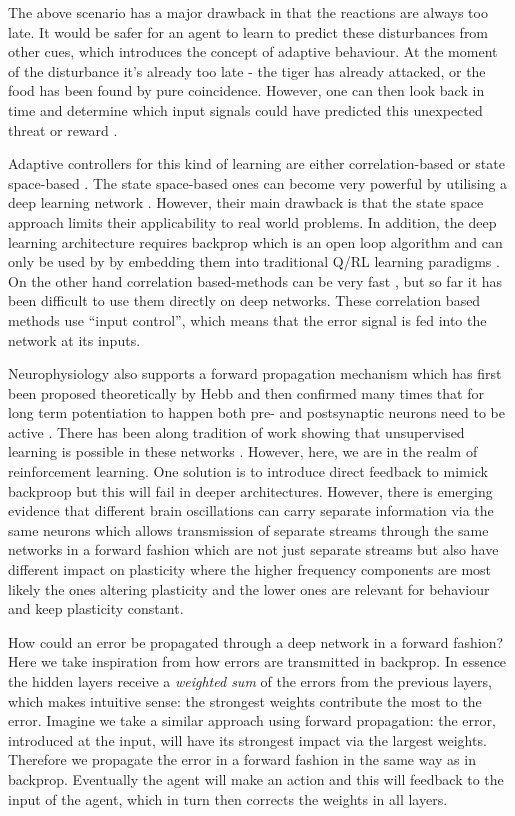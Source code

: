\documentclass{aamas2018}
\begin{document}
The above scenario has a major drawback in that the reactions are always
too late. It would be safer for an agent to learn to predict these
disturbances from other cues, which introduces the concept of adaptive behaviour.
At the moment of the disturbance it's already too late - the
tiger has already attacked, or the food has been found by pure
coincidence. However, one can then look back in time and determine
which input signals could have predicted this unexpected
threat or reward \cite{Sutton98,Woergoetter2005,PorrNecoInvco2003}.

Adaptive controllers for this kind of learning are either
correlation-based \cite{Klopf86,PorrNecoISO2003,Verschure91} or state
space-based \cite{Dayan1992,Sutton98}. The state space-based ones can
become very powerful by utilising a deep learning network
\cite{Guo2014}. However, their main drawback is that the state space
approach limits their applicability to real world problems. In
addition, the deep learning architecture requires backprop which
is an open loop algorithm and can only be used by
by embedding them into traditional Q/RL learning
paradigms \cite{Dayan1992,Guo2014}. On the other hand correlation
based-methods can be very fast \cite{Porr2006ICO}, but so far it has
been difficult to use them directly on deep networks. These
correlation based methods use ``input control'', which means that the
error signal is fed into the network at its inputs.

Neurophysiology also supports a forward propagation mechanism
which has first been proposed theoretically by Hebb \cite{Hebb49}
and then confirmed many times that for long term potentiation to happen
both pre- and postsynaptic neurons need to be active \cite{Luescher2012}.
There has been along tradition of work showing that unsupervised
learning is possible in these networks \cite{Linsker88}. However,
here, we are in the realm of reinforcement learning. One solution
is to introduce direct feedback to mimick backproop 
\cite{Lillicrap2016} but this will fail in deeper architectures.
However, there is emerging evidence that different brain oscillations
can carry separate information via the same neurons which allows
transmission of separate streams through the same networks in a
forward fashion \cite{Canolty2010} which are not just separate
streams but also have different impact on plasticity where the
higher frequency components are most likely the ones altering
plasticity and the lower ones are relevant for behaviour and
keep plasticity constant.

How could an error be propagated through a deep network in a forward
fashion? Here we take inspiration from how errors are transmitted in
backprop. In essence the hidden layers receive a \textsl{weighted sum}
of the errors from the previous layers, which makes intuitive sense:
the strongest weights contribute the most to the error. Imagine we
take a similar approach using forward propagation: the error,
introduced at the input, will have its strongest impact via the
largest weights. Therefore we propagate the error in a forward fashion
in the same way as in backprop. Eventually the agent will make an
action and this will feedback to the input of the agent, which in turn
then corrects the weights in all layers.
\end{document}

